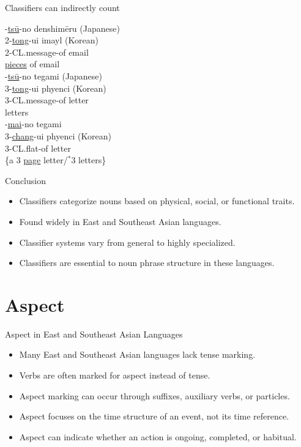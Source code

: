 \documentclass{beamer}
\newcommand{\cll}[1]{\uline{#1}}
\begin{document}
\begin{frame}{Classifiers can indirectly count}
  \begin{exe}
    \ex
   -\cll{ts\=u}-no denshim\=eru (Japanese)\\
      2-\cll{tong}-ui imayl (Korean) \\
       2-CL.message-of email \\
   \cll{pieces} of email\\
   
  \ex
  -\cll{ts\=u}-no tegami (Japanese)\\
      3-\cll{tong}-ui phyenci (Korean)\\
       3-CL.message-of letter\\
  letters           \\%
 \ex
 -\cll{mai}-no tegami \\
       3-\cll{chang}-ui phyenci (Korean)\\
      3-CL.flat-of letter \\
\trans \{a 3 \cll{page} letter/$^*$3 letters\}  \\%
    \end{exe}
\citep{Bond:1997b}
\end{frame}

\begin{frame}{Conclusion}
\begin{itemize}
    \item Classifiers categorize nouns based on physical, social, or functional traits.
    \item Found widely in East and Southeast Asian languages.
    \item Classifier systems vary from general to highly specialized.
    \item Classifiers are essential to noun phrase structure in these languages.
\end{itemize}
\end{frame}

\section{Aspect}

\begin{frame}{Aspect in East and Southeast Asian Languages}
\begin{itemize}
    \item Many East and Southeast Asian languages lack tense marking.
    \item Verbs are often marked for aspect instead of tense.
    \item Aspect marking can occur through suffixes, auxiliary verbs, or particles.
    \item Aspect focuses on the time structure of an event, not its time reference.
    \item Aspect can indicate whether an action is ongoing, completed, or habitual.
\end{itemize}
\end{frame}
\end{document}
